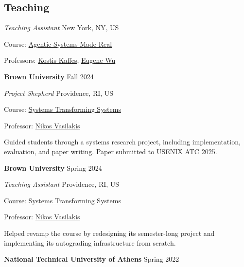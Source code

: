 \documentclass[margin,12pt]{resume}
\newcommand{\descriptionVSpace}{\vspace{0.5ex}\xspace}
\newcommand{\subsectionVSpace}{\vspace{3.5ex}\xspace}
\newcommand{\sectionVSpace}{\vspace{1ex}\xspace} %
\newcommand{\sectionVSpaceCorrection}{\vspace{-3.5ex}} %
\newcommand{\header}[1]{\textbf{#1}\xspace}
\newcommand{\institution}[1]{\header{#1}\xspace}
\newcommand{\place}[1]{#1\xspace}
\newcommand{\role}[1]{\textit{#1}\xspace}
\newcommand{\singleDate}[1]{#1\xspace}
\newcommand{\stitle}[1]{#1:\xspace}
\newenvironment{rSubsection}{}{\par\subsectionVSpace}
\newenvironment{rSection}[1]{\sectionVSpaceCorrection\section{#1}\xspace}{\sectionVSpace\par}
\newenvironment{jobDuties}{\descriptionVSpace}{\par}
\begin{document}
\begin{resume}
\begin{rSection}{Teaching}
\begin{rSubsection}
            \role{Teaching Assistant} \hfill \place{New York, NY, US}

            \stitle{Course} \href{https://w6113.github.io/}{Agentic Systems Made Real}

            \stitle{Professors} \href{https://www.cs.columbia.edu/~kkaffes/index.html}{Kostis Kaffes}, \href{https://www.cs.columbia.edu/~ewu/}{Eugene Wu}
        \end{rSubsection}

        \begin{rSubsection}
            \institution{Brown University} \hfill \singleDate{Fall 2024}

            \role{Project Shepherd} \hfill \place{Providence, RI, US}

            \stitle{Course} \href{https://cs.brown.edu/courses/csci2952r/}{Systems Transforming Systems}

            \stitle{Professor} \href{https://nikos.vasilak.is}{Nikos Vasilakis}

            \begin{jobDuties}
                Guided students through a systems research project, including implementation, evaluation, and paper writing. 
                Paper submitted to USENIX ATC 2025.
            \end{jobDuties}
        \end{rSubsection}

        \begin{rSubsection}
            \institution{Brown University} \hfill \singleDate{Spring 2024}

            \role{Teaching Assistant} \hfill \place{Providence, RI, US}

            \stitle{Course} \href{https://cs.brown.edu/courses/csci1380/s24/}{Systems Transforming Systems}

            \stitle{Professor} \href{https://nikos.vasilak.is}{Nikos Vasilakis}

            \begin{jobDuties}
                Helped revamp the course by redesigning its semester-long project and implementing its autograding infrastructure from scratch.
            \end{jobDuties}
        \end{rSubsection}

        \begin{rSubsection}
            \institution{National Technical University of Athens} \hfill \singleDate{Spring 2022}


\end{rSubsection}
\end{rSection}
\end{resume}
\end{document}
